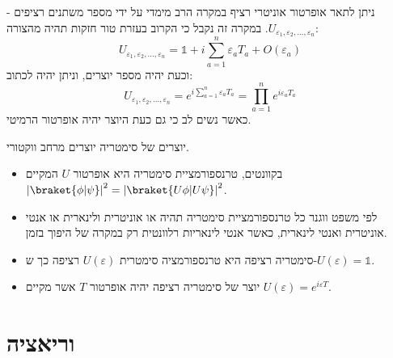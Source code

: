 \documentclass{tstextbook}
\begin{document}
\begin{proposition}
ניתן לתאר אופרטור אוניטרי רציף במקרה הרב מימדי על ידי מספר משתנים רציפים - \(U_{\varepsilon_{1},\varepsilon_{2},\dots, \varepsilon_{n}}\). במקרה זה נקבל כי הקרוב בעזרת טור חזקות תהיה מהצורה:
$$U_{\varepsilon_{1},\varepsilon_{2},\dots, \varepsilon_{n}}= \mathbb{1} + i\sum_{a=1}^{n} \varepsilon_{a}T_{a}+O\left( \varepsilon_{a} \right)$$
וכעת יהיה מספר יוצרים, וניתן יהיה לכתוב:
$$U_{\varepsilon_{1},\varepsilon_{2},\dots, \varepsilon_{n}} = e^{  i\sum_{a=1}^{n} \varepsilon_{a}T_{a}}=\prod _{a=1}^{n}e^{ i\varepsilon_{a}T_{a} }$$
כאשר נשים לב כי גם כעת היוצר יהיה אופרטור הרמיטי.

\end{proposition}
\begin{proposition}
יוצרים של סימטריה יוצרים מרחב ווקטורי.

\end{proposition}
\begin{summary}
  \begin{itemize}
    \item בקוונטים, טרנספורמציית סימטריה היא אופרטור \(U\) המקיים \(\left\lvert  \braket{ \phi | \psi }   \right\rvert ^{2}= \left\lvert  \braket{ U\phi | U\psi }   \right\rvert ^{2}\).
    \item לפי משפט ווגנר כל טרנספורמציית סימטריה תהיה או אוניטרית ולינארית או אנטי אוניטרית ואנטי לינארית, כאשר אנטי לינאריות רלוונטית רק במקרה של היפוך בזמן.
    \item סימטריה רציפה היא טרנספורמציה סימטרית \(U\left( \varepsilon \right)\) רציפה כך ש-\(U\left( \varepsilon \right)=\mathbb{1}\).
    \item יוצר של סימטריה רציפה יהיה אופרטור \(T\) אשר מקיים \(U\left( \varepsilon \right)=e^{ i\varepsilon T }\).
  \end{itemize}
\end{summary}
\section{וריאציה}
\end{document}
